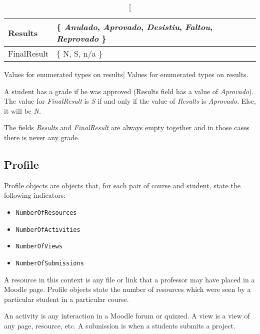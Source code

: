 \begin{table}[h!]
    \centering

    \begin{tabular}{| l | l |}
        \hline
        Results & \{ \textit{Anulado},
                     \textit{Aprovado},
                     \textit{Desistiu},
                     \textit{Faltou},
                     \textit{Reprovado}
                  \} \\ \hline
        FinalResult & \{ N, S, n/a \}  \\ \hline
    \end{tabular}

    \caption
        [Values for enumerated types on results]
        {Values for enumerated types on results.}

    \label{tab:results_fetures_enum}
\end{table}

A student has a grade if he was approved (Results field has a value of
\textit{Aprovado}). The value for \textit{FinalResult} is \textit{S} if and
only if the value of \textit{Results} is \textit{Aprovado}. Else, it will be
\textit{N}.

The fields \textit{Results} and \textit{FinalResult} are always empty together
and in those cases there is never any grade.

\subsection{Profile}
\label{sec:profile}

Profile objects are objects that, for each pair of course and student, state
the following indicators:

\begin{itemize}
    \item \texttt{NumberOfResources}
    \item \texttt{NumberOfActivities}
    \item \texttt{NumberOfViews}
    \item \texttt{NumberOfSubmissions}
\end{itemize}

A resource in this context is any file or link that a professor may have placed
in a Moodle page. Profile objects state the number of resources which were seen
by a particular student in a particular course.

An activity is any interaction in a Moodle forum or quizzed. A view is a view
of any page, resource, etc. A submission is when a students submits a project.

